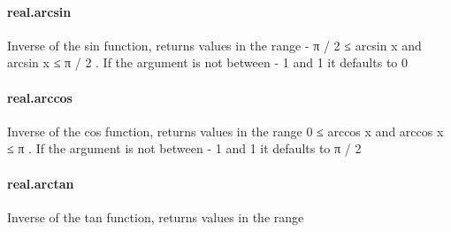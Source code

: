 \documentclass{article}
\begin{document}
\paragraph{real.arcsin}
\par
Inverse of the 
\colorbox[RGB]{253,246,227}{{{{\color[RGB]{101, 123, 131} sin }}}} function, returns values in the range 
\colorbox[RGB]{253,246,227}{{{{\color[RGB]{181, 137, 0} - }}}{{{\color[RGB]{101, 123, 131} π  }}}{{{\color[RGB]{181, 137, 0} / }}}{{{\color[RGB]{101, 123, 131}   }}}{{{\color[RGB]{108, 113, 196} 2 }}}{{{\color[RGB]{101, 123, 131}   }}}{{{\color[RGB]{181, 137, 0} ≤ }}}{{{\color[RGB]{101, 123, 131}  arcsin x }}}} and 
\colorbox[RGB]{253,246,227}{{{{\color[RGB]{101, 123, 131} arcsin x  }}}{{{\color[RGB]{181, 137, 0} ≤ }}}{{{\color[RGB]{101, 123, 131}  π  }}}{{{\color[RGB]{181, 137, 0} / }}}{{{\color[RGB]{101, 123, 131}   }}}{{{\color[RGB]{108, 113, 196} 2 }}}}.
If the argument is not between 
\colorbox[RGB]{253,246,227}{{{{\color[RGB]{181, 137, 0} - }}}{{{\color[RGB]{108, 113, 196} 1 }}}} and 
\colorbox[RGB]{253,246,227}{{{{\color[RGB]{108, 113, 196} 1 }}}} it defaults to 
\colorbox[RGB]{253,246,227}{{{{\color[RGB]{108, 113, 196} 0 }}}}\paragraph{real.arccos}
\par
Inverse of the 
\colorbox[RGB]{253,246,227}{{{{\color[RGB]{101, 123, 131} cos }}}} function, returns values in the range 
\colorbox[RGB]{253,246,227}{{{{\color[RGB]{108, 113, 196} 0 }}}{{{\color[RGB]{101, 123, 131}   }}}{{{\color[RGB]{181, 137, 0} ≤ }}}{{{\color[RGB]{101, 123, 131}  arccos x }}}} and 
\colorbox[RGB]{253,246,227}{{{{\color[RGB]{101, 123, 131} arccos x  }}}{{{\color[RGB]{181, 137, 0} ≤ }}}{{{\color[RGB]{101, 123, 131}  π }}}}.
If the argument is not between 
\colorbox[RGB]{253,246,227}{{{{\color[RGB]{181, 137, 0} - }}}{{{\color[RGB]{108, 113, 196} 1 }}}} and 
\colorbox[RGB]{253,246,227}{{{{\color[RGB]{108, 113, 196} 1 }}}} it defaults to 
\colorbox[RGB]{253,246,227}{{{{\color[RGB]{101, 123, 131} π  }}}{{{\color[RGB]{181, 137, 0} / }}}{{{\color[RGB]{101, 123, 131}   }}}{{{\color[RGB]{108, 113, 196} 2 }}}}\paragraph{real.arctan}
\par
Inverse of the 
\colorbox[RGB]{253,246,227}{{{{\color[RGB]{101, 123, 131} tan }}}} function, returns values in the range 
\end{document}
